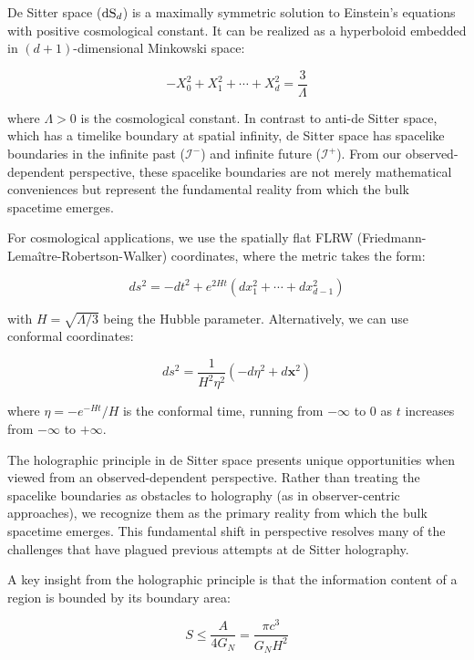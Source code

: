 \documentclass[11pt,english,twoside]{article}
\theoremstyle{plain}
\theoremstyle{definition}
\theoremstyle{remark}
\newcommand{\dS}{{\rm dS}}
\begin{document}
De Sitter space ($\dS_d$) is a maximally symmetric solution to Einstein's equations with positive cosmological constant. It can be realized as a hyperboloid embedded in $(d+1)$-dimensional Minkowski space:

\begin{equation}
\label{eq:ds_embedding}
-X_0^2 + X_1^2 + \cdots + X_d^2 = \frac{3}{\Lambda}
\end{equation}

where $\Lambda > 0$ is the cosmological constant. In contrast to anti-de Sitter space, which has a timelike boundary at spatial infinity, de Sitter space has spacelike boundaries in the infinite past ($\mathcal{I}^-$) and infinite future ($\mathcal{I}^+$). From our observed-dependent perspective, these spacelike boundaries are not merely mathematical conveniences but represent the fundamental reality from which the bulk spacetime emerges.

For cosmological applications, we use the spatially flat FLRW (Friedmann-Lemaître-Robertson-Walker) coordinates, where the metric takes the form:

\begin{equation}
\label{eq:ds_metric_flrw}
ds^2 = -dt^2 + e^{2Ht}(dx_1^2 + \cdots + dx_{d-1}^2)
\end{equation}

with $H = \sqrt{\Lambda/3}$ being the Hubble parameter. Alternatively, we can use conformal coordinates:

\begin{equation}
\label{eq:ds_metric_conformal}
ds^2 = \frac{1}{H^2\eta^2}(-d\eta^2 + d\mathbf{x}^2)
\end{equation}

where $\eta = -e^{-Ht}/H$ is the conformal time, running from $-\infty$ to $0$ as $t$ increases from $-\infty$ to $+\infty$.

The holographic principle in de Sitter space presents unique opportunities when viewed from an observed-dependent perspective. Rather than treating the spacelike boundaries as obstacles to holography (as in observer-centric approaches), we recognize them as the primary reality from which the bulk spacetime emerges. This fundamental shift in perspective resolves many of the challenges that have plagued previous attempts at de Sitter holography.

A key insight from the holographic principle is that the information content of a region is bounded by its boundary area:

\begin{equation}
\label{eq:holographic_bound}
S \leq \frac{A}{4G_N} = \frac{\pi c^3}{G_N H^2}
\end{equation}
\end{document}

